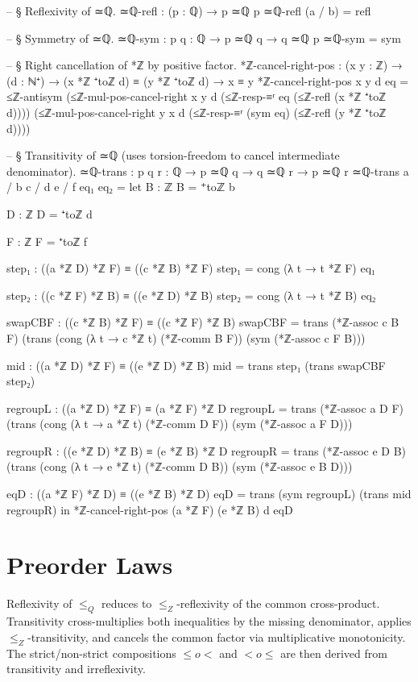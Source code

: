 \documentclass[11pt,a4paper]{book}
\def\circ{o}%
\def\mathbb#1{#1}%
\begin{document}
\begin{code}
-- § Reflexivity of ≃ℚ.
≃ℚ-refl : (p : ℚ) → p ≃ℚ p
≃ℚ-refl (a / b) = refl

-- § Symmetry of ≃ℚ.
≃ℚ-sym : {p q : ℚ} → p ≃ℚ q → q ≃ℚ p
≃ℚ-sym = sym

-- § Right cancellation of *ℤ by positive factor.
*ℤ-cancel-right-pos : (x y : ℤ) → (d : ℕ⁺) → (x *ℤ ⁺toℤ d) ≡ (y *ℤ ⁺toℤ d) → x ≡ y
*ℤ-cancel-right-pos x y d eq =
  ≤ℤ-antisym
    (≤ℤ-mul-pos-cancel-right x y d (≤ℤ-resp-≡ʳ eq (≤ℤ-refl (x *ℤ ⁺toℤ d))))
    (≤ℤ-mul-pos-cancel-right y x d (≤ℤ-resp-≡ʳ (sym eq) (≤ℤ-refl (y *ℤ ⁺toℤ d))))

-- § Transitivity of ≃ℚ (uses torsion-freedom to cancel intermediate denominator).
≃ℚ-trans : {p q r : ℚ} → p ≃ℚ q → q ≃ℚ r → p ≃ℚ r
≃ℚ-trans {a / b} {c / d} {e / f} eq₁ eq₂ =
  let
    B : ℤ
    B = ⁺toℤ b

    D : ℤ
    D = ⁺toℤ d

    F : ℤ
    F = ⁺toℤ f

    step₁ : ((a *ℤ D) *ℤ F) ≡ ((c *ℤ B) *ℤ F)
    step₁ = cong (λ t → t *ℤ F) eq₁

    step₂ : ((c *ℤ F) *ℤ B) ≡ ((e *ℤ D) *ℤ B)
    step₂ = cong (λ t → t *ℤ B) eq₂

    swapCBF : ((c *ℤ B) *ℤ F) ≡ ((c *ℤ F) *ℤ B)
    swapCBF =
      trans
        (*ℤ-assoc c B F)
        (trans
          (cong (λ t → c *ℤ t) (*ℤ-comm B F))
          (sym (*ℤ-assoc c F B)))

    mid : ((a *ℤ D) *ℤ F) ≡ ((e *ℤ D) *ℤ B)
    mid = trans step₁ (trans swapCBF step₂)

    regroupL : ((a *ℤ D) *ℤ F) ≡ (a *ℤ F) *ℤ D
    regroupL =
      trans
        (*ℤ-assoc a D F)
        (trans
          (cong (λ t → a *ℤ t) (*ℤ-comm D F))
          (sym (*ℤ-assoc a F D)))

    regroupR : ((e *ℤ D) *ℤ B) ≡ (e *ℤ B) *ℤ D
    regroupR =
      trans
        (*ℤ-assoc e D B)
        (trans
          (cong (λ t → e *ℤ t) (*ℤ-comm D B))
          (sym (*ℤ-assoc e B D)))

    eqD : ((a *ℤ F) *ℤ D) ≡ ((e *ℤ B) *ℤ D)
    eqD = trans (sym regroupL) (trans mid regroupR)
  in
  *ℤ-cancel-right-pos (a *ℤ F) (e *ℤ B) d eqD
\end{code}

\section{Preorder Laws}

Reflexivity of $\le_{\mathbb{Q}}$ reduces to $\le_{\mathbb{Z}}$-reflexivity of the common cross-product.
Transitivity cross-multiplies both inequalities by the missing denominator, applies $\le_{\mathbb{Z}}$-transitivity, and cancels the common factor via multiplicative monotonicity.
The strict/non-strict compositions $\le \circ < $ and $< \circ \le$ are then derived from transitivity and irreflexivity.
\end{document}
